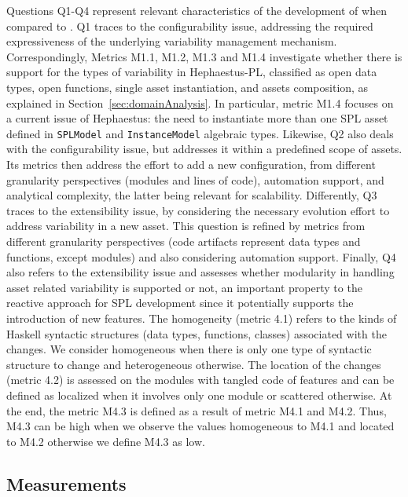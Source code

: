 Questions Q1-Q4 represent relevant characteristics of the development of \hpl{} when compared to \hp. Q1 traces to the configurability issue, addressing the required expressiveness of the underlying variability management mechanism. Correspondingly, Metrics M1.1, M1.2, M1.3 and M1.4 investigate whether there is support for the types of variability in Hephaestus-PL, classified as open data types, open functions, single asset instantiation, and assets composition, as explained in Section~\ref{sec:domainAnalysis}.  In particular, metric M1.4 focuses on a current issue of Hephaestus: the need to instantiate more than one SPL asset defined in \texttt{SPLModel} and \texttt{InstanceModel} algebraic types.  Likewise, Q2 also deals with the configurability issue, but addresses it within a predefined scope of assets. Its metrics then address the effort to add a new configuration, from different granularity perspectives (modules and lines of code), automation support, and analytical complexity, the latter being relevant for scalability.  Differently, Q3 traces to the extensibility issue, by considering the necessary evolution effort to address variability in a new asset. This question is refined by metrics from different granularity perspectives (code artifacts represent data types and functions, except modules) and also considering automation support. Finally, Q4 also refers to the extensibility issue and assesses whether modularity in handling asset related variability is supported or not, an important property to the reactive approach for SPL development since it potentially supports the introduction of new features.  The homogeneity (metric 4.1) refers to the kinds of Haskell syntactic structures (data types, functions, classes) associated with the changes. We consider homogeneous when there is only one type of syntactic structure to change and heterogeneous otherwise.  The location of the changes (metric 4.2) is assessed on the modules with tangled code of features and can be defined as localized when it involves only one module or scattered otherwise.  At the end, the metric M4.3 is defined as a result of metric M4.1 and M4.2. Thus, M4.3 can be high when we observe the values homogeneous to M4.1 and located to M4.2 otherwise we define M4.3 as low.


\subsection{Measurements} 
\label{sec:measurements}

